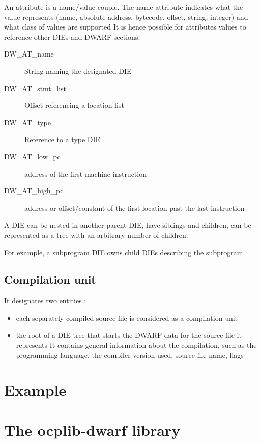 An attribute is a name/value couple.
The name attribute indicates what the value represents (name, absolute address,
bytecode, offset, string, integer) and what class of values are supported
It is hence possible for attributes values to reference other DIEs and DWARF sections.

\begin{description}
    \item[DW\_AT\_name] String naming the designated DIE
    \item[DW\_AT\_stmt\_list] Offset referencing a location list
    \item[DW\_AT\_type] Reference to a type DIE
    \item[DW\_AT\_low\_pc] address of the first machine instruction
    \item[DW\_AT\_high\_pc] address or offset/constant of the first location past the last instruction
\end{description}

A DIE can be nested in another parent DIE, have siblings and children,
can be represented as a tree with an arbitrary number of children.

For example, a subprogram DIE owns child DIEs describing the subprogram.

\subsection{Compilation unit}

It designates two entities :

\begin{itemize}
    \item each separately compiled source file is considered as a compilation unit
    \item the root of a DIE tree that starts the DWARF data for the source file it represents
        It contains general information about the compilation,
        such as the programming language, the compiler version used, source file name, flags
\end{itemize}

\section{Example}

\section{The ocplib-dwarf library}


